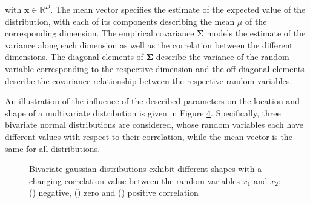 with $\bm{x} \in \mathbb{R}^D$. The mean vector specifies the estimate of the expected value of the distribution, with each of its components describing the mean $\mu$ of the corresponding dimension. The empirical covariance $\bm{\Sigma}$ models the estimate of the variance along each dimension as well as the correlation between the different dimensions. The diagonal elements of $\bm{\Sigma}$ describe the variance of the random variable corresponding to the respective dimension and the off-diagonal elements describe the covariance relationship between the respective random variables. 

An illustration of the influence of the described parameters on the location and shape of a multivariate distribution is given in Figure \ref{fig:multiple_bivariate}. Specifically, three bivariate normal distributions are considered, whose random variables each have different values with respect to their correlation, while the mean vector is the same for all distributions.
 
\begin{figure}%
    \centering%
    \begin{subfigure}[b]{0.25\textwidth}%
        \centering\captionsetup{width=.8\linewidth}%
        \caption{}%
        \label{subfig:bivariate_neg}%
    \end{subfigure}%
    \begin{subfigure}[b]{0.33\textwidth}%
        \centering\captionsetup{width=.8\linewidth}%
        \caption{}%
        \label{subfig:bivariate_neutral}%
    \end{subfigure}%
    \begin{subfigure}[b]{0.33\textwidth}%
        \centering\captionsetup{width=.8\linewidth}%
        \caption{}%
        \label{subfig:bivariate_pos}%
    \end{subfigure}%
    \caption{Bivariate gaussian distributions exhibit different shapes with a changing correlation value between the random variables $x_1$ and $x_2$: () negative, () zero and () positive correlation}%
    \label{fig:multiple_bivariate}%
\end{figure}%

